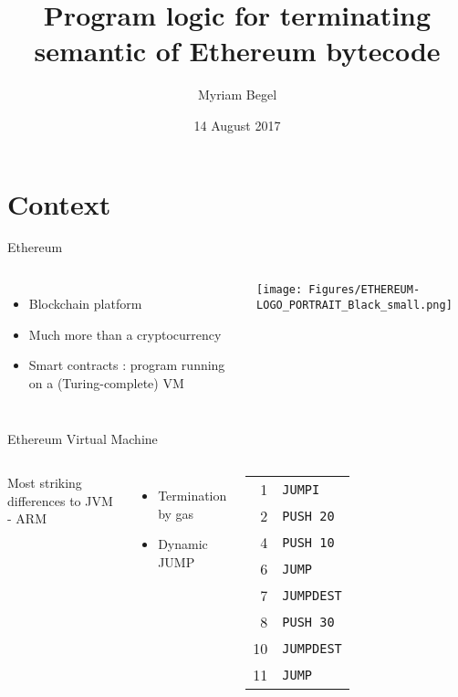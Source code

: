 \documentclass{beamer}
\title{Program logic for terminating semantic of Ethereum bytecode}
\author{Myriam Begel}
\date{14 August 2017}
\begin{document}
\maketitle


\part{Context}
\frame{\partpage}

\begin{frame}{Ethereum}
	\begin{columns}[c]
		\begin{itemize}
			\item Blockchain platform
			\item Much more than a cryptocurrency
			\item Smart contracts : program running on a (Turing-complete) VM
		\end{itemize}
		\texttt{[image: Figures/ETHEREUM-LOGO\_PORTRAIT\_Black\_small.png]}
	\end{columns}
\end{frame}

\begin{frame}{Ethereum Virtual Machine \footnotesize{\cite{wood2014ethereum}}}
	\begin{columns}[c]
		Most striking differences to JVM - ARM
		\begin{itemize}
			\item Termination by gas
			\item Dynamic JUMP
		\end{itemize}
		\begin{tabular}{r l}
			1 & \texttt{JUMPI} \\
			2 & \texttt{PUSH~20}\\
			4 & \texttt{PUSH~10}\\
			6 & \texttt{JUMP}\\
			7 & \texttt{JUMPDEST}\\
			8 & \texttt{PUSH~30}\\
			10 & \texttt{JUMPDEST}\\
			11 & \texttt{JUMP}
		\end{tabular}
	\end{columns}
\end{frame}
\end{document}
